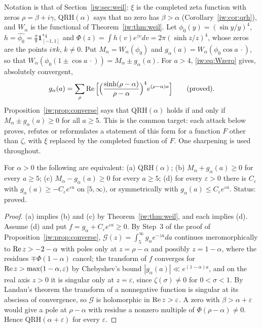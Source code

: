 Notation is that of Section~\ref{iw:sec:weil}: $\xi$ is the completed zeta function with zeros $\rho=\beta+i\gamma$, $\mathrm{QRH}(\alpha)$ says that no zero has $\beta>\alpha$ (Corollary~\ref{iw:cor:qrh}), and $W_\alpha$ is the functional of Theorem~\ref{iw:thm:weil}. Let $\phi_0(y)=(\sin y/y)^4$, $h=\widehat{\phi_0}=\frac\pi8\mathbf 1_{[-1,1]}^{*4}$ and $\Phi(z)=\int h(v)e^{zv}dv=2\pi(\sinh z/z)^4$, whose zeros are the points $i\pi k$, $k\ne0$. Put $M_\alpha=W_\alpha(\phi_0)$ and $g_\alpha(a)=W_\alpha(\phi_0\cos a\,\cdot)$, so that $W_\alpha(\phi_0(1\pm\cos a\,\cdot))=M_\alpha\pm g_\alpha(a)$. For $a>4$, \eqref{iw:eq:Wzero} gives, absolutely convergent,
\begin{equation}\label{rg:eq:zeroside}
g_\alpha(a)=\sum_\rho\operatorname{Re}\Big[\Big(\frac{\sinh(\rho-\alpha)}{\rho-\alpha}\Big)^4e^{(\rho-\alpha)a}\Big]\qquad(\text{proved}).
\end{equation}
Proposition~\ref{iw:prop:converse} says that $\mathrm{QRH}(\alpha)$ holds if and only if $M_\alpha\pm g_\alpha(a)\ge0$ for all $a\ge5$. This is the common target: each attack below proves, refutes or reformulates a statement of this form for a function $F$ other than $\zeta$, with $\xi$ replaced by the completed function of $F$. One sharpening is used throughout.

\begin{proposition}\label{rg:prop:onesign}
For $\alpha>0$ the following are equivalent: (a) $\mathrm{QRH}(\alpha)$; (b) $M_\alpha+g_\alpha(a)\ge0$ for every $a\ge5$; (c) $M_\alpha-g_\alpha(a)\ge0$ for every $a\ge5$; (d) for every $\varepsilon>0$ there is $C_\varepsilon$ with $g_\alpha(a)\ge-C_\varepsilon e^{\varepsilon a}$ on $[5,\infty)$, or symmetrically with $g_\alpha(a)\le C_\varepsilon e^{\varepsilon a}$. Status: proved.
\end{proposition}

\begin{proof}
(a) implies (b) and (c) by Theorem~\ref{iw:thm:weil}, and each implies (d). Assume (d) and put $f=g_\alpha+C_\varepsilon e^{\varepsilon a}\ge0$. By Step~3 of the proof of Proposition~\ref{iw:prop:converse}, $\mathcal G(z)=\int_5^\infty g_\alpha e^{-za}da$ continues meromorphically to $\operatorname{Re} z>-2-\alpha$ with poles only at $z=\rho-\alpha$ and possibly $z=1-\alpha$, where the residues $\mp\Phi(1-\alpha)$ cancel; the transform of $f$ converges for $\operatorname{Re} z>\max(1-\alpha,\varepsilon)$ by Chebyshev's bound $|g_\alpha(a)|\ll e^{(1-\alpha)a}$, and on the real axis $z>0$ it is singular only at $z=\varepsilon$, since $\zeta(\sigma)\ne0$ for $0<\sigma<1$. By Landau's theorem \cite{Widder41} the transform of a nonnegative function is singular at its abscissa of convergence, so $\mathcal G$ is holomorphic in $\operatorname{Re} z>\varepsilon$. A zero with $\beta>\alpha+\varepsilon$ would give a pole at $\rho-\alpha$ with residue a nonzero multiple of $\Phi(\rho-\alpha)\ne0$. Hence $\mathrm{QRH}(\alpha+\varepsilon)$ for every $\varepsilon$. \qedhere
\end{proof}

